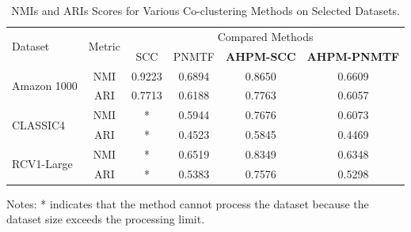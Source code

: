 \documentclass[letterpaper, 10 pt, conference]{ieeeconf}  %
\begin{document}
\begin{table}[!htbp]
    \centering
    \caption{NMIs and ARIs Scores for Various Co-clustering Methods on Selected Datasets.}
    \label{tab:evaluation-metrics}
    \begin{tabular}{@{} l c cccc @{}}
        \toprule
        \multirow{2}{*}{Dataset}     & \multirow{2}{*}{Metric} & \multicolumn{4}{c}{Compared Methods}                                                                                                        \\
        \cmidrule{3-6}
                                     &                         & SCC \cite{dhillon2001CoclusteringDocumentsWords} & PNMTF \cite{chen2023ParallelNonNegativeMatrix} & \textbf{AHPM-SCC} & \textbf{AHPM-PNMTF} \\
        \midrule
        \multirow{2}{*}{Amazon 1000} & NMI                     & 0.9223                                           & 0.6894                                         & 0.8650            & 0.6609              \\
                                     & ARI                     & 0.7713                                           & 0.6188                                         & 0.7763            & 0.6057              \\
        \multirow{2}{*}{CLASSIC4}    & NMI                     & *                                                & 0.5944                                         & 0.7676            & 0.6073              \\
                                     & ARI                     & *                                                & 0.4523                                         & 0.5845            & 0.4469              \\
        \multirow{2}{*}{RCV1-Large}  & NMI                     & *                                                & 0.6519                                         & 0.8349            & 0.6348              \\
                                     & ARI                     & *                                                & 0.5383                                         & 0.7576            & 0.5298              \\
        \bottomrule
    \end{tabular}
    \begin{tablenotes}
        \small
        \item Notes: * indicates that the method cannot process the dataset because the dataset size exceeds the processing limit.
    \end{tablenotes}
\end{table}
\end{document}
